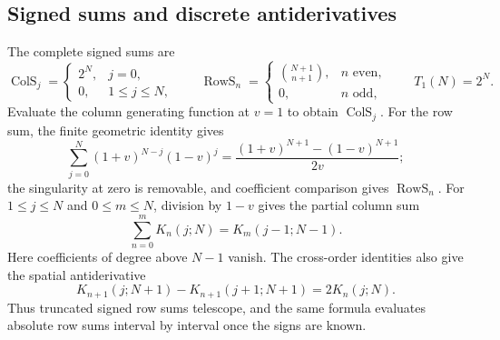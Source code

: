 \subsection{Signed sums and discrete antiderivatives}
The complete signed sums are
\begin{equation}\label{eq:sums-signed}
\operatorname{ColS}_j=\begin{cases}2^N,&j=0,\\0,&1\le j\le N,\end{cases}
\qquad
\operatorname{RowS}_n=\begin{cases}\binom{N+1}{n+1},&n\text{ even},\\0,&n\text{ odd},\end{cases}
\qquad T_1(N)=2^N.
\end{equation}
Evaluate the column generating function at $v=1$ to obtain $\operatorname{ColS}_j$. For the row sum, the finite geometric identity gives
\[
\sum_{j=0}^N(1+v)^{N-j}(1-v)^j
=\frac{(1+v)^{N+1}-(1-v)^{N+1}}{2v};
\]
the singularity at zero is removable, and coefficient comparison gives $\operatorname{RowS}_n$.
For $1\le j\le N$ and $0\le m\le N$, division by $1-v$ gives the partial column sum
\begin{equation}\label{eq:sums-partial-column}
\sum_{n=0}^m K_n(j;N)=K_m(j-1;N-1).
\end{equation}
Here coefficients of degree above $N-1$ vanish. The cross-order identities also give the spatial antiderivative
\begin{equation}\label{eq:sums-spatial-primitive}
K_{n+1}(j;N+1)-K_{n+1}(j+1;N+1)=2K_n(j;N).
\end{equation}
Thus truncated signed row sums telescope, and the same formula evaluates absolute row sums interval by interval once the signs are known.

